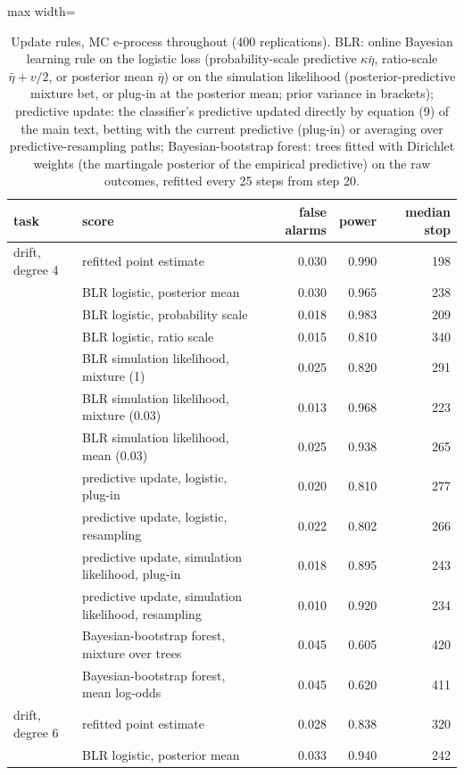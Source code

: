 \documentclass[11pt]{article}
\theoremstyle{remark}
\begin{document}
\begin{table}[t]
\centering
\caption{Update rules, MC e-process throughout (400 replications). BLR: online
Bayesian learning rule on the logistic loss (probability-scale predictive
$\kappa\bar\eta$, ratio-scale $\bar\eta+v/2$, or posterior mean $\bar\eta$) or on the
simulation likelihood (posterior-predictive mixture bet, or plug-in at the
posterior mean; prior variance in brackets); predictive update: the
classifier's predictive updated directly by equation (9) of the main text, betting with the
current predictive (plug-in) or averaging over predictive-resampling paths;
Bayesian-bootstrap forest: trees fitted with Dirichlet weights (the martingale
posterior of the empirical predictive) on the raw outcomes, refitted every 25
steps from step 20.}
\label{tab:blr-full}
\begin{adjustbox}{max width=\textwidth}
\begin{tabular}{llrrr}
\toprule
task & score & false alarms & power & median stop \\
\midrule
drift, degree 4 & refitted point estimate & 0.030 & 0.990 & 198 \\
 & BLR logistic, posterior mean & 0.030 & 0.965 & 238 \\
 & BLR logistic, probability scale & 0.018 & 0.983 & 209 \\
 & BLR logistic, ratio scale & 0.015 & 0.810 & 340 \\
 & BLR simulation likelihood, mixture (1) & 0.025 & 0.820 & 291 \\
 & BLR simulation likelihood, mixture (0.03) & 0.013 & 0.968 & 223 \\
 & BLR simulation likelihood, mean (0.03) & 0.025 & 0.938 & 265 \\
 & predictive update, logistic, plug-in & 0.020 & 0.810 & 277 \\
 & predictive update, logistic, resampling & 0.022 & 0.802 & 266 \\
 & predictive update, simulation likelihood, plug-in & 0.018 & 0.895 & 243 \\
 & predictive update, simulation likelihood, resampling & 0.010 & 0.920 & 234 \\
 & Bayesian-bootstrap forest, mixture over trees & 0.045 & 0.605 & 420 \\
 & Bayesian-bootstrap forest, mean log-odds & 0.045 & 0.620 & 411 \\
drift, degree 6 & refitted point estimate & 0.028 & 0.838 & 320 \\
 & BLR logistic, posterior mean & 0.033 & 0.940 & 242 \\

\end{tabular}
\end{adjustbox}
\end{table}
\end{document}
